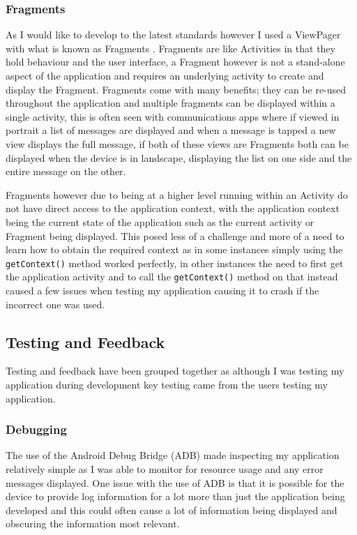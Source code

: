 \subsubsection{Fragments}\label{fragments}

As I would like to develop to the latest standards however I used a
ViewPager with what is known as Fragments \parencite{fragment}.
Fragments are like Activities in that they hold behaviour and the user
interface, a Fragment however is not a stand-alone aspect of the
application and requires an underlying activity to create and display
the Fragment. Fragments come with many benefits; they can be re-used
throughout the application and multiple fragments can be displayed
within a single activity, this is often seen with communications apps
where if viewed in portrait a list of messages are displayed and when a
message is tapped a new view displays the full message, if both of these
views are Fragments both can be displayed when the device is in
landscape, displaying the list on one side and the entire message on the
other.

Fragments however due to being at a higher level running within an
Activity do not have direct access to the application context, with the
application context being the current state of the application such as
the current activity or Fragment being displayed. This posed less of a
challenge and more of a need to learn how to obtain the required context
as in some instances simply using the \lstinline!getContext()! method
worked perfectly, in other instances the need to first get the
application activity and to call the \lstinline!getContext()! method on
that instead caused a few issues when testing my application causing it
to crash if the incorrect one was used.

\subsection{Testing and Feedback}\label{testing-and-feedback}

Testing and feedback have been grouped together as although I was
testing my application during development key testing came from the
users testing my application.

\subsubsection{Debugging}\label{debugging}

The use of the Android Debug Bridge (ADB) \parencite{adb} made
inspecting my application relatively simple as I was able to monitor for
resource usage and any error messages displayed. One issue with the use
of ADB is that it is possible for the device to provide log information
for a lot more than just the application being developed and this could
often cause a lot of information being displayed and obscuring the
information most relevant.

